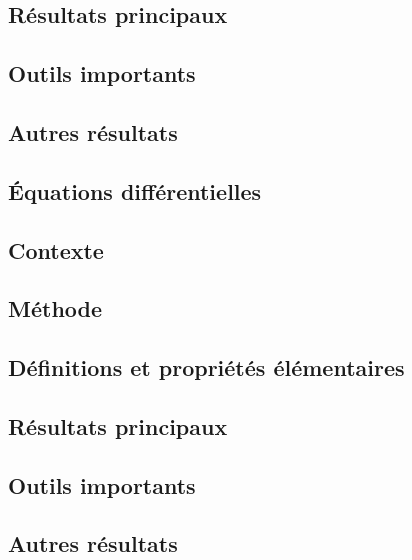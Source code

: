 \documentclass[11pt,a4paper]{article}
\begin{document}
\subsection*{Résultats principaux}


\subsection*{Outils importants}


\subsection*{Autres résultats}

\newpage
\begin{center}  
\section*{Équations différentielles} 
\end{center}




\subsection*{Contexte}

\subsection*{Méthode}

\subsection*{Définitions et propriétés élémentaires}

\subsection*{Résultats principaux}

\subsection*{Outils importants}


\subsection*{Autres résultats}
\end{document}
